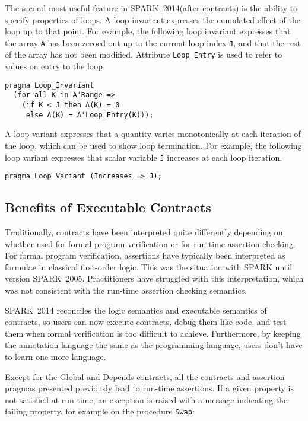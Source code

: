 \documentclass[10pt,a4paper,twocolumn]{article}
\newcommand{\oldspark}{SPARK~2005\xspace}
\newcommand{\newspark}{SPARK~2014\xspace}
\newcommand{\SPARK}[1]{\lstinline[language=Ada,basicstyle={\footnotesize
      \sffamily},framesep=0pt]$#1$}
\begin{document}
The second most useful feature in \newspark (after contracts) is the ability to
specify properties of loops. A loop invariant expresses the cumulated effect
of the loop up to that point. For example, the following loop invariant
expresses that the array \SPARK{A} has been zeroed out up to the current loop
index \SPARK{J}, and that the rest of the array has not been modified.
Attribute \SPARK{Loop_Entry} is used to refer to values on entry to the loop.

\begin{lstlisting}
pragma Loop_Invariant
  (for all K in A'Range =>
    (if K < J then A(K) = 0
     else A(K) = A'Loop_Entry(K)));
\end{lstlisting}

A loop variant expresses that a quantity varies monotonically at each iteration
of the loop, which can be used to show loop termination. For example, the
following loop variant expresses that scalar variable \SPARK{J} increases at
each loop iteration.

\begin{lstlisting}
pragma Loop_Variant (Increases => J);
\end{lstlisting}

\subsection{Benefits of Executable Contracts}

Traditionally, contracts have been interpreted quite differently depending on
whether used for formal program verification or for run-time assertion
checking. For formal program verification, assertions have typically been
interpreted as formulae in classical first-order logic. This was the situation
with SPARK until version \oldspark. Practitioners have struggled with this
interpretation, which was not consistent with the run-time assertion checking
semantics.\cite{tseChalin10}

\newspark reconciles the logic semantics and executable semantics of contracts,
so users can now execute contracts, debug them like code, and test them when
formal verification is too difficult to achieve. Furthermore, by keeping the
annotation language the same as the programming language, users don't have to
learn one more language.

Except for the Global and Depends contracts, all the contracts and assertion
pragmas presented previously lead to run-time assertions. If a given property
is not satisfied at run time, an exception is raised with a message indicating
the failing property, for example on the procedure \SPARK{Swap}:
\end{document}
